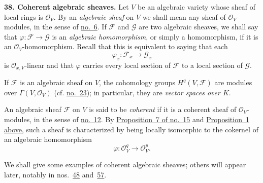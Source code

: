 
\medskip
{}\label{fac:II:2:no:38}
\textbf{38. Coherent algebraic sheaves.}
\label{fac:II:2:no:38:def:algebraic-sheaf}
Let $V$ be an algebraic variety whose sheaf of local rings is $\mathcal{O}_V$. By an \textit{algebraic sheaf} on $V$ we shall mean any sheaf of $\mathcal{O}_V$-modules, in the sense of \hyperref[fac:I:1:no:6]{no.~6}. \label{fac:II:2:no:38:def:algebraic-homomorphism}If $\mathcal{F}$ and $\mathcal{G}$ are two algebraic sheaves, we shall say that $\varphi:\mathcal{F}\to\mathcal{G}$ is an \textit{algebraic homomorphism}, or simply a homomorphism, if it is an $\mathcal{O}_V$-homomorphism. Recall that this is equivalent to saying that each
\[
\varphi_x:\mathcal{F}_x\longrightarrow\mathcal{G}_x
\]
is $\mathcal{O}_{x,V}$-linear and that $\varphi$ carries every local section of $\mathcal{F}$ to a local section of $\mathcal{G}$.

If $\mathcal{F}$ is an algebraic sheaf on $V$, the cohomology groups $H^q(V,\mathcal{F})$ are modules over $\Gamma(V,\mathcal{O}_V)$ (cf. \hyperref[fac:I:3:no:23]{no.~23}); in particular, they are \textit{vector spaces over $K$}.

\label{fac:II:2:no:38:def:coherent-algebraic-sheaf}
An algebraic sheaf $\mathcal{F}$ on $V$ is said to be \textit{coherent} if it is a coherent sheaf of $\mathcal{O}_V$-modules, in the sense of \hyperref[fac:I:2:no:12]{no.~12}. By \hyperref[fac:I:2:no:15:prop:7]{Proposition~7 of no.~15} and \hyperref[fac:II:2:no:37:prop:1]{Proposition~1 above}, such a sheaf is characterized by being locally isomorphic to the cokernel of an algebraic homomorphism
\[
\varphi:\mathcal{O}_V^q\longrightarrow\mathcal{O}_V^p.
\]

We shall give some examples of coherent algebraic sheaves; others will appear later, notably in nos.~\hyperref[fac:II:4:no:48]{48} and~\hyperref[fac:III:2:no:57]{57}.
